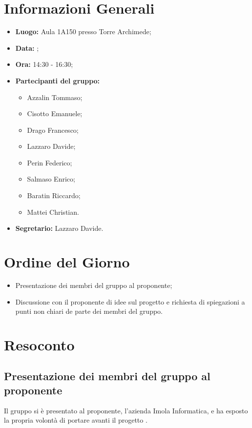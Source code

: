 \section{Informazioni Generali}
\begin{itemize}
\item \textbf{Luogo:} Aula 1A150 presso Torre Archimede;
\item \textbf{Data:} \Data;
\item \textbf{Ora:} 14:30 - 16:30;
\item \textbf{Partecipanti del gruppo:}
	\begin{itemize}
	\item Azzalin Tommaso; 
	\item Cisotto Emanuele; 
	\item Drago Francesco;
	\item Lazzaro Davide;
	\item Perin Federico;
	\item Salmaso Enrico;
	\item Baratin Riccardo;
	\item Mattei Christian.
	\end{itemize} 
\item \textbf{Segretario:} Lazzaro Davide.
\end{itemize}


\section{Ordine del Giorno}
\begin{itemize}
	\item Presentazione dei membri del gruppo al proponente;
	\item Discussione con il proponente di idee sul progetto e richiesta di spiegazioni a punti non chiari de parte dei membri del gruppo.
\end{itemize}

\section{Resoconto}
\subsection{Presentazione dei membri del gruppo al proponente}
Il gruppo si è presentato al proponente, l'azienda Imola Informatica, e ha esposto la propria volontà di portare avanti il progetto \NomeProgetto.

